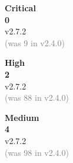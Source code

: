 \documentclass{article}
\begin{document}
\noindent
\begin{minipage}[t]{0.24\textwidth}
    \colorbox{SeverityCritical!20}{%
        \begin{minipage}{\linewidth}
            \centering
            \vspace{0.3cm}
            {\large \textbf{Critical}}\\[0.2cm]
            {\Huge \textcolor{SeverityCritical}{\textbf{0}}}\\[0.1cm]
            {\small v2.7.2}\\[0.1cm]
            {\footnotesize \textcolor{gray}{(was 9 in v2.4.0)}}\\
            \vspace{0.3cm}
        \end{minipage}
    }
\end{minipage}%
\hfill
\begin{minipage}[t]{0.24\textwidth}
    \colorbox{SeverityHigh!20}{%
        \begin{minipage}{\linewidth}
            \centering
            \vspace{0.3cm}
            {\large \textbf{High}}\\[0.2cm]
            {\Huge \textcolor{SeverityHigh}{\textbf{2}}}\\[0.1cm]
            {\small v2.7.2}\\[0.1cm]
            {\footnotesize \textcolor{gray}{(was 88 in v2.4.0)}}\\
            \vspace{0.3cm}
        \end{minipage}
    }
\end{minipage}%
\hfill
\begin{minipage}[t]{0.24\textwidth}
    \colorbox{SeverityMedium!20}{%
        \begin{minipage}{\linewidth}
            \centering
            \vspace{0.3cm}
            {\large \textbf{Medium}}\\[0.2cm]
            {\Huge \textcolor{SeverityMedium}{\textbf{4}}}\\[0.1cm]
            {\small v2.7.2}\\[0.1cm]
            {\footnotesize \textcolor{gray}{(was 98 in v2.4.0)}}\\
            \vspace{0.3cm}
        \end{minipage}
    }
\end{minipage}%
\hfill
\end{document}
